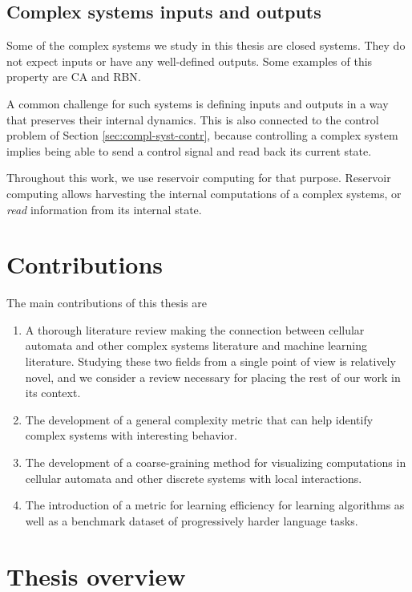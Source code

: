 \subsection{Complex systems inputs and outputs}

Some of the complex systems we study in this thesis are closed systems. They do
not expect inputs or have any well-defined outputs. Some examples of this
property are \ac{CA} and \ac{RBN}.

A common challenge for such
systems is defining inputs and outputs in a way that preserves their internal
dynamics. This is also connected to the control problem of Section
\ref{sec:compl-syst-contr}, because controlling a complex system implies being
able to send a control signal and read back its current state.

Throughout this work, we use reservoir computing for that purpose.
Reservoir computing allows harvesting the internal computations of a complex
systems, or \emph{read} information from its internal state.


\section{Contributions}

The main contributions of this thesis are
\begin{enumerate}
  \item A thorough literature review making the connection between cellular
        automata and other complex systems literature and machine learning
        literature. Studying these two fields from a single point of view is
        relatively novel, and we consider a review necessary for placing the
        rest of our work in its context.

  \item The development of a general complexity metric that can help identify
        complex systems with interesting behavior.

  \item The development of a coarse-graining method for visualizing computations
        in cellular automata and other discrete systems with local interactions.

  \item The introduction of a metric for learning efficiency for learning
        algorithms as well as a benchmark dataset of progressively harder
        language tasks.
\end{enumerate}

\section{Thesis overview}

